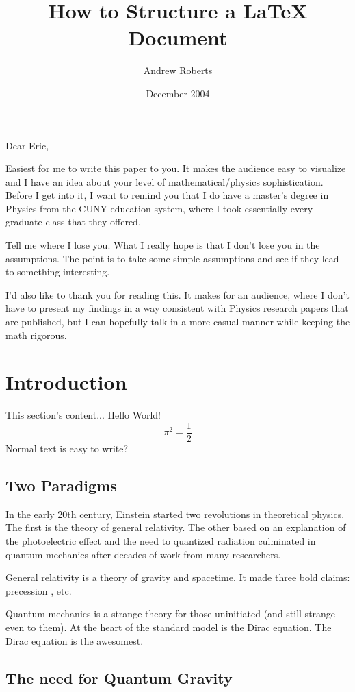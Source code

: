 \documentclass {article}
\begin{document}
\title{How to Structure a LaTeX Document}
\author{Andrew Roberts}
\date{December 2004}
\maketitle

Dear Eric,

Easiest for me to write this paper to you. It makes the audience easy to visualize and I have an idea about your level of mathematical/physics sophistication. Before I get into it, I want to remind you that I do have a master’s degree in Physics from the CUNY education system, where I took essentially every graduate class that they offered.

Tell me where I lose you. What I really hope is that I don’t lose you in the assumptions. The point is to take some simple assumptions and see if they lead to something interesting.

I’d also like to thank you for reading this. It makes for an audience, where I don’t have to present my findings in a way consistent with Physics research papers that are published, but I can hopefully talk in a more casual manner while keeping the math rigorous.


\section{Introduction}
This section's content...
	Hello World!
$$	\pi^2 = \frac 1 2 $$
Normal text is easy to write?

\subsection{Two Paradigms}
In the early 20th century, Einstein started two revolutions in theoretical physics. The first is the theory of general relativity. The other based on an explanation of the photoelectric effect and the need to quantized radiation culminated in quantum mechanics after decades of work from many researchers. 

General relativity is a theory of gravity and spacetime. It made three bold claims: precession , etc.

Quantum mechanics is a strange theory for those uninitiated (and still strange even to them). At the heart of the standard model is the Dirac equation. The Dirac equation is the awesomest.

\subsection{The need for Quantum Gravity}
\end{document}
